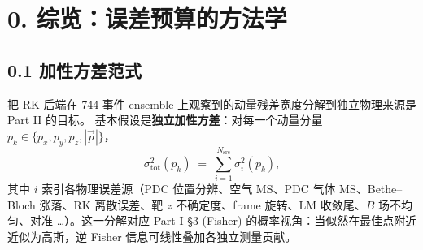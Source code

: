 %
%
%
%
%
%

\providecommand{\StatusReport}{文献~[1]}
\providecommand{\DeepDiveData}{[deep-dive-data]}

\section{0. 综览：误差预算的方法学}
\label{sec:partIIa:budget-overview}

\subsection*{0.1 加性方差范式}

把 RK 后端在 744 事件 ensemble 上观察到的动量残差宽度分解到独立物理来源是 Part II 的目标。
基本假设是\textbf{独立加性方差}：对每一个动量分量 $p_k\in\{p_x,p_y,p_z,|\vec p|\}$，
\begin{equation}
  \sigma_\mathrm{tot}^2(p_k)\;=\;\sum_{i=1}^{N_\mathrm{src}} \sigma_i^2(p_k),
  \label{eq:partIIa:budget:add-var}
\end{equation}
其中 $i$ 索引各物理误差源（PDC 位置分辨、空气 MS、PDC 气体 MS、Bethe--Bloch 涨落、RK 离散误差、靶 $z$ 不确定度、frame 旋转、LM 收敛尾、$B$ 场不均匀、对准 \ldots）。这一分解对应 Part I §3 (Fisher) 的概率视角：当似然在最佳点附近近似为高斯，逆 Fisher 信息可线性叠加各独立测量贡献。

